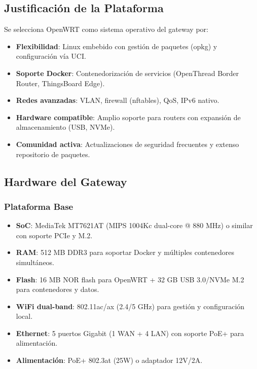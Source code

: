 \subsection{Justificación de la Plataforma}

Se selecciona OpenWRT como sistema operativo del gateway por:

\begin{itemize}
    \item \textbf{Flexibilidad}: Linux embebido con gestión de paquetes (opkg) y configuración vía UCI.
    \item \textbf{Soporte Docker}: Contenedorización de servicios (OpenThread Border Router, ThingsBoard Edge).
    \item \textbf{Redes avanzadas}: VLAN, firewall (nftables), QoS, IPv6 nativo.
    \item \textbf{Hardware compatible}: Amplio soporte para routers con expansión de almacenamiento (USB, NVMe).
    \item \textbf{Comunidad activa}: Actualizaciones de seguridad frecuentes y extenso repositorio de paquetes.
\end{itemize}

\subsection{Hardware del Gateway}

\subsubsection{Plataforma Base}

\begin{itemize}
    \item \textbf{SoC}: MediaTek MT7621AT (MIPS 1004Kc dual-core @ 880 MHz) o similar con soporte PCIe y M.2.
    \item \textbf{RAM}: 512 MB DDR3 para soportar Docker y múltiples contenedores simultáneos.
    \item \textbf{Flash}: 16 MB NOR flash para OpenWRT + 32 GB USB 3.0/NVMe M.2 para contenedores y datos.
    \item \textbf{WiFi dual-band}: 802.11ac/ax (2.4/5 GHz) para gestión y configuración local.
    \item \textbf{Ethernet}: 5 puertos Gigabit (1 WAN + 4 LAN) con soporte PoE+ para alimentación.
    \item \textbf{Alimentación}: PoE+ 802.3at (25W) o adaptador 12V/2A.
\end{itemize}

